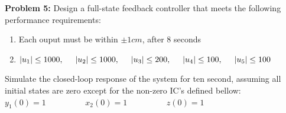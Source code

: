 \documentclass[14pt,a4paper]{article}
\begin{document}
\large\textbf{Problem 5:} Design a full-state feedback controller that meets the following performance requirements:
	\begin{enumerate}
		\item Each ouput must be within $\pm 1 cm$, after 8 seconds
		\item $|u_1| \leq 1000, \hspace{0.5cm}|u_2| \leq 1000, \hspace{0.5cm} |u_3| \leq 200, \hspace{0.5cm} |u_4| \leq 100, \hspace{0.5cm} |u_5| \leq 100$
	\end{enumerate}
	Simulate the closed-loop response of the system for ten second, assuming all initial states are zero except for the non-zero IC's defined bellow:\\
	\hspace*{2cm} $y_1(0) = 1 \hspace{2cm} x_2(0) = 1 \hspace{2cm} z(0) = 1$
	
\end{document}
